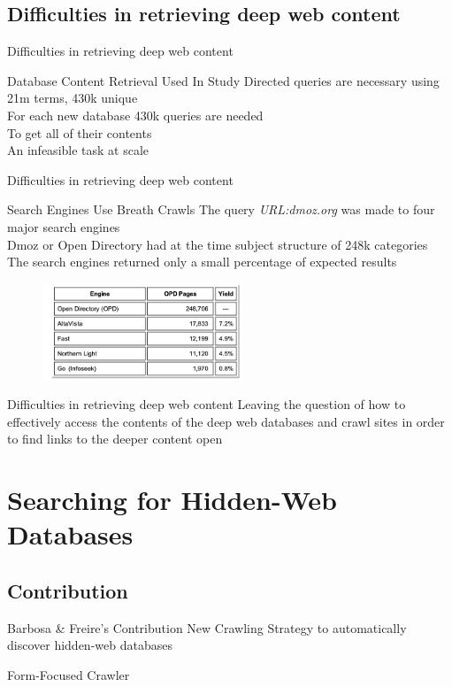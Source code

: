 \documentclass{beamer}
\begin{document}
\subsection{Difficulties in retrieving deep web content }
\begin{frame}[fragile]{Difficulties in retrieving deep web content }
\begin{block}{Database Content Retrieval Used In Study}
Directed queries are necessary 
using 21m terms, 430k unique \\
For each new database 430k queries are needed \\
To get all of their contents \\
An infeasible task at scale
\end{block}

\end{frame}
\begin{frame}[fragile]{Difficulties in retrieving deep web content }
\begin{block}{Search Engines Use Breath Crawls}
The query  \emph{URL:dmoz.org} was made to four major search engines \\
Dmoz or Open Directory had at the time subject structure of 248k categories \\
The search engines returned only a small percentage of expected results
\end{block}
\begin{figure}
			\includegraphics[width=6cm]{dwII.png}
		\end{figure}
\end{frame}
\begin{frame}[fragile]{Difficulties in retrieving deep web content }
Leaving the question of how to effectively access the contents of the deep 
web databases and crawl sites in order to find links to the deeper content open
\end{frame}
\section{Searching for Hidden-Web Databases}
\subsection{Contribution}
\begin{frame}{ Barbosa \&  Freire's Contribution}
New Crawling Strategy to automatically discover hidden-web databases
\end{frame}

\begin{frame}{ Form-Focused Crawler}
\end{frame} %
\end{document}
